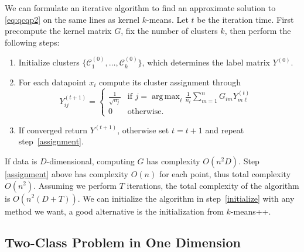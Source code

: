 \documentclass{article}
\DeclareMathOperator*{\argmax}{arg\,max}
\newcommand\C{{\mathcal{C}}}
\newcommand\Zt{Y}
\begin{document}
We can formulate an iterative algorithm to find
an approximate solution to \eqref{eq:qcqp2} on the same lines
as kernel $k$-means.
Let $t$ be the iteration time. First precompute the kernel
matrix $G$, fix the number of clusters $k$, then
perform the following steps:
\begin{enumerate}
\item \label{initialize} 
Initialize clusters $\{ \C_1^{(0)},\dotsc,\C_k^{(0)} \}$, which
determines the label matrix $\Zt^{(0)}$.
\item \label{assignment} For each datapoint $x_i$ compute
its cluster assignment through
\begin{equation}
\label{eq:algo}
\Zt^{(t+1)}_{ij} = 
\begin{cases}
\tfrac{1}{\sqrt{n_j}} & \mbox{if $j = \argmax_\ell \tfrac{1}{n_\ell} 
\sum_{m=1}^n G_{i m} \Zt^{(t)}_{m\ell}$ } \\
0 & \mbox{otherwise.}
\end{cases}
\end{equation}
\item If converged return $\Zt^{(t+1)}$, otherwise
set $t = t+1$ and repeat step~\ref{assignment}.
\end{enumerate}
If data is $D$-dimensional, computing $G$ has complexity
$O(n^2 D)$. Step \ref{assignment} above has complexity $O(n)$ for
each point, thus total complexity $O(n^2)$. Assuming we perform $T$ 
iterations,
the total complexity of the algorithm is $O(n^2(D + T))$.
We can initialize the algorithm in step~\ref{initialize} with any method
we want, a good alternative is the initialization from $k$-means++.

\subsection{Two-Class Problem in One Dimension}
\end{document}
